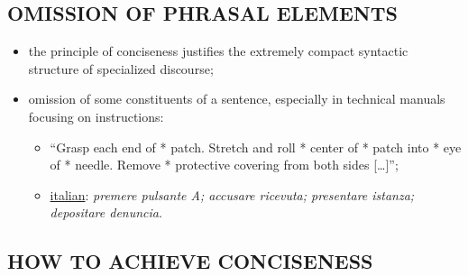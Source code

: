 \subsection{OMISSION OF PHRASAL ELEMENTS}

\begin{itemize}

\item the principle of conciseness justifies the extremely compact syntactic structure of specialized discourse;
\item omission of some constituents of a sentence, especially in technical manuals focusing on instructions: 

\begin{itemize}

\item “Grasp each end of * patch. Stretch and roll * center of * patch into * eye of * needle. Remove * protective covering from both sides […]”; 
\item\underline{italian}: \textit{premere pulsante A; accusare ricevuta; presentare istanza; depositare denuncia}.

\end{itemize}

\end{itemize}

\subsection{HOW TO ACHIEVE CONCISENESS}

